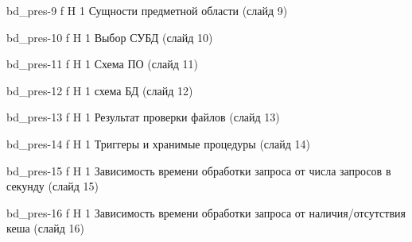 \begin{appendices}
	{bd_pres-9} %
	{f} %
	{H} %
	{1\textwidth} %
	{Сущности предметной области (слайд 9)} %
	
	{bd_pres-10} %
	{f} %
	{H} %
	{1\textwidth} %
	{Выбор СУБД (слайд 10)} %
	
	{bd_pres-11} %
	{f} %
	{H} %
	{1\textwidth} %
	{Схема ПО (слайд 11)} %
	
	{bd_pres-12} %
	{f} %
	{H} %
	{1\textwidth} %
	{схема БД (слайд 12)} %
	
	{bd_pres-13} %
	{f} %
	{H} %
	{1\textwidth} %
	{Результат проверки файлов (слайд 13)} %
	
	{bd_pres-14} %
	{f} %
	{H} %
	{1\textwidth} %
	{Триггеры и хранимые процедуры (слайд 14)} %
	
	{bd_pres-15} %
	{f} %
	{H} %
	{1\textwidth} %
	{Зависимость времени обработки запроса от числа запросов в секунду (слайд 15)} %
	
	{bd_pres-16} %
	{f} %
	{H} %
	{1\textwidth} %
	{Зависимость времени обработки запроса от наличия/отсутствия кеша (слайд 16)} %
	

\end{appendices}
